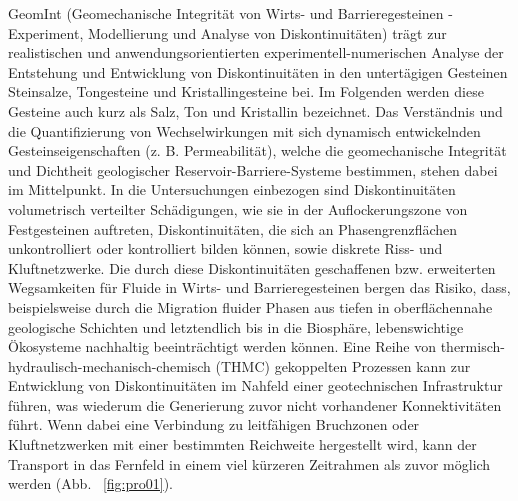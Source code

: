 GeomInt (Geomechanische Integrität von Wirts- und Barrieregesteinen - Experiment, Modellierung und Analyse von Diskontinuitäten) trägt zur realistischen und anwendungsorientierten experimentell-numerischen Analyse der Entstehung und Entwicklung von Diskontinuitäten in den untertägigen Gesteinen Steinsalze, Tongesteine und Kristallingesteine bei. Im Folgenden werden diese Gesteine auch kurz als Salz, Ton und Kristallin bezeichnet. Das Verständnis und die Quantifizierung von Wechselwirkungen mit sich dynamisch entwickelnden Gesteinseigenschaften (z. B. Permeabilität), welche die geomechanische Integrität und Dichtheit geologischer Reservoir-Barriere-Systeme bestimmen, stehen dabei im Mittelpunkt. In die Untersuchungen einbezogen sind Diskontinuitäten volumetrisch verteilter Schädigungen, wie sie in der Auflockerungszone von Festgesteinen auftreten, Diskontinuitäten, die sich an Phasengrenzflächen unkontrolliert oder kontrolliert bilden können, sowie diskrete Riss- und Kluftnetzwerke. Die durch diese Diskontinuitäten geschaffenen bzw. erweiterten Wegsamkeiten für Fluide in Wirts- und Barrieregesteinen bergen das Risiko, dass, beispielsweise durch die Migration fluider Phasen aus tiefen in oberflächennahe geologische Schichten und letztendlich bis in die Biosphäre, lebenswichtige Ökosysteme nachhaltig beeinträchtigt werden können. Eine Reihe von thermisch-hydraulisch-mechanisch-chemisch (THMC) gekoppelten Prozessen kann zur Entwicklung von Diskontinuitäten im Nahfeld einer geotechnischen Infrastruktur führen, was wiederum die Generierung zuvor nicht vorhandener Konnektivitäten führt. Wenn dabei eine Verbindung zu leitfähigen Bruchzonen oder Kluftnetzwerken mit einer bestimmten Reichweite hergestellt wird, kann der Transport in das Fernfeld in einem viel kürzeren Zeitrahmen als zuvor möglich werden (Abb. ~\ref{fig:pro01}).


